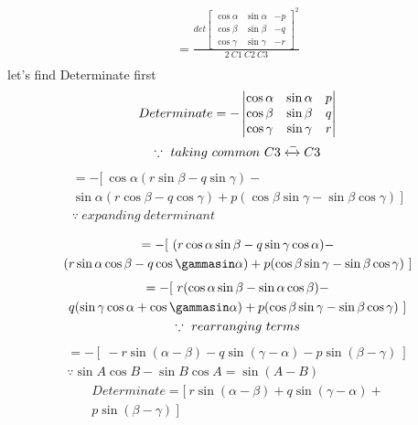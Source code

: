 \documentclass[journal,12pt,twocolumn]{IEEEtran}
\begin{document}
\begin{multline}
     =\frac{det \begin{bmatrix}\cos\alpha&\sin\alpha&-p\\\cos\beta&\sin\beta&-q\\\cos\gamma&\sin\gamma&-r\end{bmatrix}^{2}}{2~C1~C2~C3}\\\
\end{multline}
let's  find Determinate first
\begin{multline}
     Determinate=-\begin{vmatrix} \cos\alpha&\sin\alpha&p\\\cos\beta&\sin\beta&q\\\cos\gamma&\sin\gamma&r \end{vmatrix}\\\because~taking~ common ~ C3 \xleftrightarrow{{-}} C3
\end{multline}
\begin{multline}
     = -[ ~
     \cos\alpha(r\sin\beta-q\sin\gamma) -\\ \sin\alpha(r\cos\beta - q\cos\gamma) + p(\cos\beta \sin\gamma-\sin\beta\cos\gamma)
    ~ ]\\ \because ~expanding~ determinant
\end{multline}

\begin{multline}
     = -[ ~
     (r\cos\alpha\sin\beta-q\sin\gamma\cos\alpha) -\\ (r\sin\alpha\cos\beta - q\cos\gammasin\alpha) + p(\cos\beta \sin\gamma-\sin\beta\cos\gamma)
    ~ ]
\end{multline}
\begin{multline}
     = -[ ~
     r(\cos\alpha\sin\beta- \sin\alpha\cos\beta)-\\ q(\sin\gamma\cos\alpha+ \cos\gammasin\alpha) + p(\cos\beta \sin\gamma-\sin\beta\cos\gamma)
    ~ ]\\ \because ~rearranging ~terms
\end{multline}
\begin{multline}
     = -[ ~
     -r\sin(\alpha-\beta)- q\sin(\gamma-\alpha) - p \sin(\beta-\gamma)
    ~ ]\\ 
\because \sin A\cos B - \sin B\cos A=\sin(A-B)
\end{multline}
\begin{multline}
   Determinate  = [ ~
     r\sin(\alpha-\beta)+ q\sin(\gamma-\alpha) + \\p \sin(\beta-\gamma)
    ~ ]
\end{multline}
\end{document}
